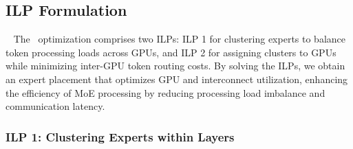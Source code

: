 
\subsection{ILP Formulation}~\label{sec:ilp}
%
%
%
The \expertune~optimization comprises two ILPs: ILP 1 for clustering experts to balance token processing loads across GPUs, and ILP 2 for assigning clusters to GPUs while minimizing inter-GPU token routing costs.
%
%
By solving the ILPs, we obtain an expert placement that optimizes GPU and interconnect utilization, enhancing the efficiency of MoE processing by reducing processing load imbalance and communication latency.

\subsubsection{ILP 1: Clustering Experts within Layers}

